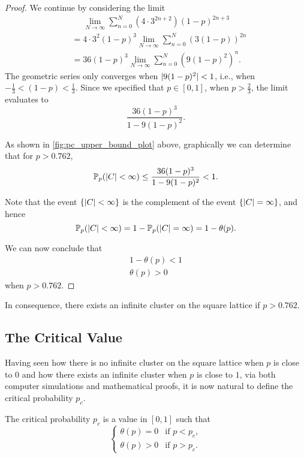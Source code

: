 \documentclass[a4paper, 12pt]{article}
\begin{document}
\begin{proof}
We continue by considering the limit
\begin{align*}
    &\phantom{=}\lim_{N \to \infty} \sum_{n = 0}^N (4 \cdot 3^{2n + 2}) (1 - p)^{2n + 3}\\
    &= 4 \cdot 3^2 (1 - p)^3 \lim_{N \to \infty} \sum_{n = 0}^N \left(3 (1 - p)\right)^{2n}\\
    &= 36 (1 - p)^3 \lim_{N \to \infty} \sum_{n = 0}^N \left(9 (1 - p)^2\right)^n.
\end{align*}
The geometric series only converges when $\lvert 9 (1 - p)^2 \rvert < 1$, i.e., when $-\frac{1}{3} < (1 - p) < \frac{1}{3}$. Since we specified that $p \in \left[0, 1\right]$, when $p > \frac{2}{3}$, the limit evaluates to
\[
    \frac{36 (1 - p)^3}{1 - 9 (1 - p)^2}.
\]



As shown in \cref{fig:pc_upper_bound_plot} above, graphically we can determine that for $p > 0.762$, \[\mathbb{P}_p(\lvert C \rvert < \infty) \leq \frac{36(1 - p)^3}{1 - 9(1 - p)^2} < 1.\]

Note that the event $\{\lvert C \rvert < \infty\}$ is the complement of the event $\{\lvert C \rvert = \infty\}$, and hence
\[
    \mathbb{P}_p(\lvert C \rvert < \infty) = 1 - \mathbb{P}_p(\lvert C \rvert = \infty) = 1 - \theta(p).
\]

We can now conclude that
\begin{align*}
    1 - \theta(p) < 1\\
    \theta(p) > 0
\end{align*}
when $p > 0.762$.
\end{proof}

In consequence, there exists an infinite cluster on the square lattice if $p > 0.762$.

\subsection{The Critical Value}\label{subsec:pc}
Having seen how there is no infinite cluster on the square lattice when $p$ is close to $0$ and how there exists an infinite cluster when $p$ is close to $1$, via both computer simulations and mathematical proofs, it is now natural to define the critical probability $p_c$.

\begin{defn}\label{defn:pc}
The critical probability $p_c$ is a value in $\left[0, 1\right]$ such that
\[
\begin{cases}
\theta(p) = 0 &\text{if } p < p_c,\\
\theta(p) > 0 &\text{if } p > p_c.
\end{cases}
\]
\end{defn}
\end{document}
